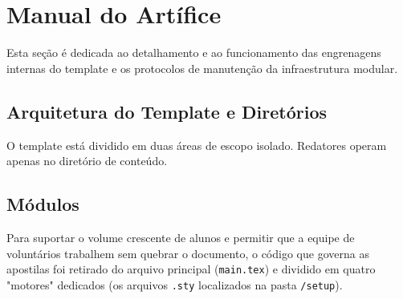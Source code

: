 
\section{Manual do Artífice}
\label{sec:niv_tutorial_artifice}

Esta seção é dedicada ao detalhamento e ao funcionamento das engrenagens internas do template e os protocolos de manutenção da infraestrutura modular.

\subsection{Arquitetura do Template e Diretórios}

O template está dividido em duas áreas de escopo isolado. Redatores operam apenas no diretório de conteúdo.

\vspace{0.5cm}
\vspace{0.5cm}

\subsection{Módulos}

Para suportar o volume crescente de alunos e permitir que a equipe de voluntários trabalhem sem quebrar o documento, o código que governa as apostilas foi retirado do arquivo principal (\texttt{main.tex}) e dividido em quatro "motores" dedicados (os arquivos \texttt{.sty} localizados na pasta \texttt{/setup}).

